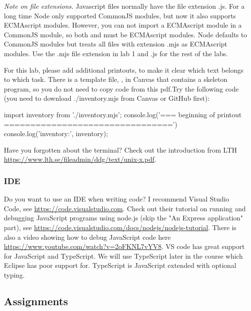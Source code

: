 \documentclass[fleqn, article, a4paper]{memoir}
\begin{document}
\noindent \emph{Note on file extensions.} Javascript files normally have the file extension .js. For a long time Node only supported CommonJS modules, but now it also supports ECMAscript modules. However, you can not import a ECMAscript module in a CommonJS module, so both  and  must be ECMAscript modules. Node defaults to CommonJS modules but treats all files with extension .mjs as ECMAscript modules. Use the .mjs file extension in lab 1 and .js for the rest of the labs.
 
For this lab, please add additional printouts, to make it clear which text belongs to which task. There is a template file, , in Canvas that contains a skeleton program, so you do not need to copy code from this pdf.Try the following code (you need to download ./inventory.mjs from Canvas or GitHub first):
\begin{Code}
import inventory from './inventory.mjs';
console.log('\n=== beginning of printout ================================')
console.log('inventory:', inventory);
\end{Code}

\noindent Have you forgotten about the terminal? Check out the introduction from LTH \url{https://www.lth.se/fileadmin/ddg/text/unix-x.pdf}.

\subsubsection*{IDE}

\noindent Do you want to use an IDE when writing code? I recommend Visual Studio Code, see \url{https://code.visualstudio.com}. Check out their tutorial on running and debugging JavaScript programs using node.js (skip the "An Express application" part), see \url{https://code.visualstudio.com/docs/nodejs/nodejs-tutorial}. There is also a video showing how to debug JavaScript code here \url{https://www.youtube.com/watch?v=2oFKNL7vYV8}. VS code has great support for JavaScript and TypeScript. We will use TypeScript later in the course which Eclipse has poor support for. TypeScript is JavaScript extended with optional typing.

\subsection*{Assignments}
\end{document}
